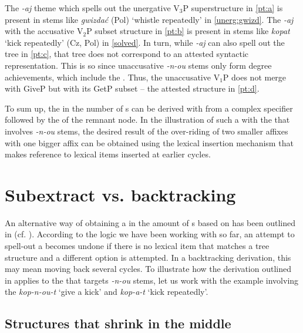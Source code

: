 \noindent
The \textit{-aj} theme  which spells out the unergative V$_{3}$P superstructure in \ref{pt:a} is present in stems like \textit{gwizda\'c} (Pol) `whistle repeatedly' in \ref{unerg:gwizd}. The \textit{-aj} with the accusative V$_{2}$P subset structure in \ref{pt:b} is present in stems like \textit{kopat} `kick repeatedly' (Cz, Pol) in \ref{solved}. 
In turn, while \textit{-aj} can also spell out the tree in \ref{pt:c}, that tree does not correspond to an attested syntactic representation. This is so since unaccusative \textit{-n-ou} stems only form degree achievements, which include the . Thus, the unaccusative V$_{1}$P does not merge with GiveP but with its GetP subset -- the attested structure in \ref{pt:d}.
\par
To sum up, the  in the number of s can be derived with  from a complex specifier followed by the  of the remnant node. In the illustration of such a  with the  that involves \textit{-n-ou} stems, the desired result of the over-riding of two smaller affixes  with one bigger affix can be obtained using the lexical insertion mechanism that makes reference to lexical items inserted at earlier cycles. 

\section{Subextract vs. backtracking}

An alternative way of obtaining a  in the amount of s based on  has been outlined in  (cf. \citealt[160--168]{Pantcheva2011}).  According to the  logic we have been working with so far, an attempt to spell-out a  becomes undone if there is no lexical item that matches a tree structure and a different  option is attempted. In a backtracking derivation, this may mean moving back several cycles. To illustrate how the  derivation outlined in  applies to the  that targets \textit{-n-ou} stems, let us work with the example involving the  \textit{kop-n-ou-t} `give a kick' and \textit{kop-a-t} `kick repeatedly'.\largerpage

\subsection{Structures that shrink  in the middle}

